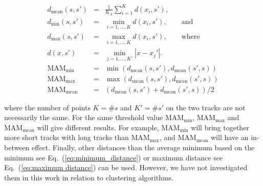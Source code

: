 \documentclass[preprint,authoryear,a4paper,10pt,onecolumn]{elsarticle}
\begin{document}
\begin{appendices}
\begin{eqnarray}
d_{\textrm{mean}}(s,s') & = & \frac{1}{K_{A}}\sum_{i=1}^{K}d(x_{i},s'),\nonumber \\
d_{\textrm{min}}(s,s') & = & \min_{i=1,...,K}d(x_{i},s'),\qquad\textrm{and}\label{eq:minimum_distance}\\
d_{\textrm{max}}(s,s') & = & \max_{i=1,...,K }d(x_{i},s'),\qquad\textrm{where}\label{eq:maximum distance}\\
d(x,s') & = & \min_{j=1,...,K'}|x-x_{j}'|.\nonumber \\
\textrm{MAM}_{\textrm{min}} & = & \min(d_{\textrm{mean}}(s,s'),d_{\textrm{mean}}(s',s))\label{eq:min_average_distance}\\
\textrm{MAM}_{\textrm{max}} & = & \max(d_{\textrm{mean}}(s,s'),d_{\textrm{mean}}(s',s))\nonumber \\
\textrm{MAM}_{\textrm{mean}} & = & (d_{\textrm{mean}}(s,s')+d_{\textrm{mean}}(s',s))/2\label{eq:mean_average_distance}\end{eqnarray}


\noindent
where the number of points $K=\#s$ and $K'=\#s'$ on the two tracks
are not necessarily the same. For the same threshold value $\textrm{MAM}_{\textrm{min}}$,
$\textrm{MAM}_{\textrm{max}}$ and $\textrm{MAM}_{\textrm{mean}}$
will give different results. For example, $\textrm{MAM}_{\textrm{min}}$ will
bring together more short tracks with long tracks than $\textrm{MAM}_{\textrm{max}}$,
and 
$\textrm{MAM}_{\textrm{mean}}$ 
will have an in-between effect. Finally, other distances than the average
minimum based on the minimum see Eq.~(\ref{eq:minimum_distance})
or maximum distance see Eq.~(\ref{eq:maximum distance}) can be used.
However, we have not investigated them in this work in relation to
clustering algorithms.

\end{appendices}
\end{document}
